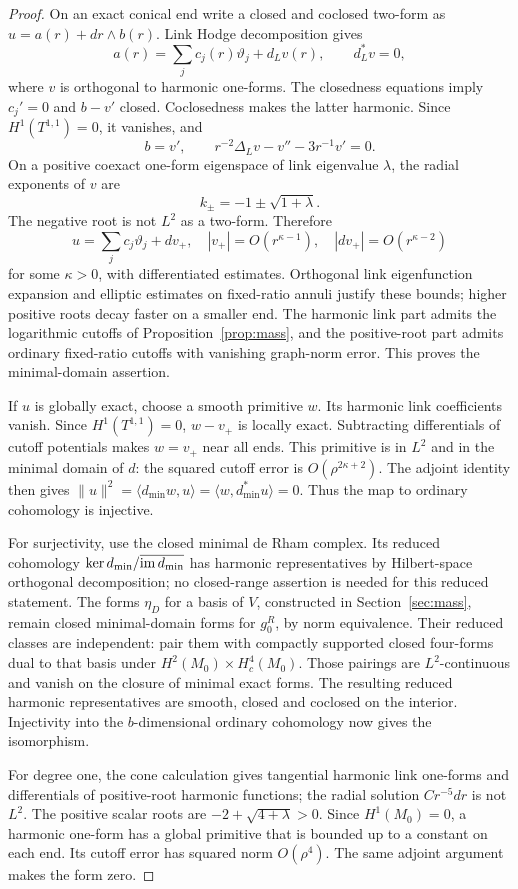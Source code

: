 \begin{proof}
On an exact conical end write a closed and coclosed two-form as
$u=a(r)+dr\wedge b(r)$. Link Hodge decomposition gives
\[
 a(r)=\sum_jc_j(r)\vartheta_j+d_Lv(r),\qquad d_L^*v=0,
\]
where $v$ is orthogonal to harmonic one-forms. The closedness equations
imply $c_j'=0$ and $b-v'$ closed. Coclosedness makes the latter
harmonic. Since $H^1(T^{1,1})=0$, it vanishes, and
\[
 b=v',\qquad r^{-2}\Delta_Lv-v''-3r^{-1}v'=0.
\] On a positive coexact one-form eigenspace of
link eigenvalue $\lambda$, the radial exponents of $v$ are
\[
 k_\pm=-1\pm\sqrt{1+\lambda}.
\]
The negative root is not $L^2$ as a two-form. Therefore
\begin{equation}\label{eq:cone-harmonic-expansion}
 u=\sum_jc_j\vartheta_j+dv_+,
 \quad |v_+|=O(r^{\kappa-1}),\quad |dv_+|=O(r^{\kappa-2})
\end{equation}
for some $\kappa>0$, with differentiated estimates. Orthogonal link
eigenfunction expansion and elliptic estimates on fixed-ratio annuli
justify these bounds; higher positive roots decay faster on a smaller
end. The harmonic link part admits the logarithmic cutoffs of
Proposition~\ref{prop:mass}, and the positive-root part admits ordinary
fixed-ratio cutoffs with vanishing graph-norm error. This proves the
minimal-domain assertion.

If $u$ is globally exact, choose a smooth primitive $w$. Its harmonic
link coefficients vanish. Since $H^1(T^{1,1})=0$, $w-v_+$ is locally
exact. Subtracting differentials of cutoff potentials makes $w=v_+$
near all ends. This primitive is in $L^2$ and in the minimal domain of
$d$: the squared cutoff error is $O(\rho^{2\kappa+2})$.
The adjoint identity then gives
$\|u\|^2=\langle d_{\min}w,u\rangle=\langle w,d_{\min}^*u\rangle=0$.
Thus the map to ordinary cohomology is injective.

For surjectivity, use the closed minimal de Rham complex. Its reduced
cohomology $\ker d_{\min}/\overline{\operatorname{im} d_{\min}}$ has harmonic
representatives by Hilbert-space orthogonal decomposition; no closed-range
assertion is needed for this reduced statement. The forms $\eta_D$ for a basis of $V$, constructed in
Section~\ref{sec:mass}, remain closed minimal-domain forms for
$g_0^R$, by norm equivalence. Their reduced classes are independent:
pair them with compactly supported closed four-forms dual to that basis
under $H^2(M_0)\times H_c^4(M_0)$. Those pairings are $L^2$-continuous
and vanish on the closure of minimal exact forms. The resulting reduced
harmonic representatives are smooth, closed and coclosed on the interior.
Injectivity into the $b$-dimensional ordinary cohomology now gives the
isomorphism.

For degree one, the cone calculation gives tangential harmonic link
one-forms and differentials of positive-root harmonic functions; the
radial solution $Cr^{-5}dr$ is not $L^2$. The positive scalar roots are
$-2+\sqrt{4+\lambda}>0$. Since $H^1(M_0)=0$, a harmonic one-form has
a global primitive that is bounded up to a constant on each end. Its
cutoff error has squared norm $O(\rho^4)$. The same adjoint argument
makes the form zero.
\end{proof}

